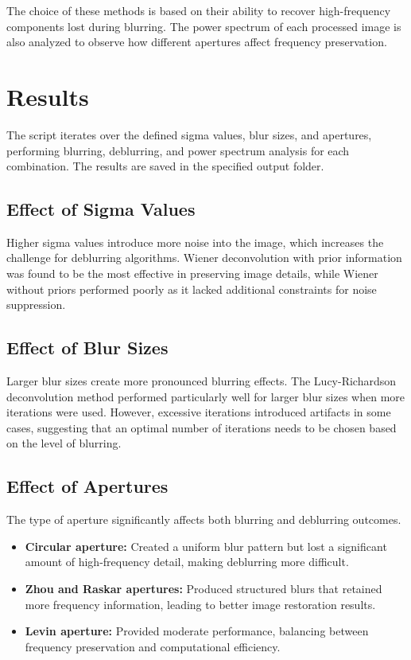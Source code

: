 \documentclass[a4paper,10pt]{article}
\begin{document}
The choice of these methods is based on their ability to recover high-frequency components lost during blurring. The power spectrum of each processed image is also analyzed to observe how different apertures affect frequency preservation.

\section{Results}
The script iterates over the defined sigma values, blur sizes, and apertures, performing blurring, deblurring, and power spectrum analysis for each combination. The results are saved in the specified output folder.

\subsection{Effect of Sigma Values}
Higher sigma values introduce more noise into the image, which increases the challenge for deblurring algorithms. Wiener deconvolution with prior information was found to be the most effective in preserving image details, while Wiener without priors performed poorly as it lacked additional constraints for noise suppression.

\subsection{Effect of Blur Sizes}
Larger blur sizes create more pronounced blurring effects. The Lucy-Richardson deconvolution method performed particularly well for larger blur sizes when more iterations were used. However, excessive iterations introduced artifacts in some cases, suggesting that an optimal number of iterations needs to be chosen based on the level of blurring.

\subsection{Effect of Apertures}
The type of aperture significantly affects both blurring and deblurring outcomes. 
\begin{itemize}
    \item \textbf{Circular aperture:} Created a uniform blur pattern but lost a significant amount of high-frequency detail, making deblurring more difficult.
    \item \textbf{Zhou and Raskar apertures:} Produced structured blurs that retained more frequency information, leading to better image restoration results.
    \item \textbf{Levin aperture:} Provided moderate performance, balancing between frequency preservation and computational efficiency.
\end{itemize}
\end{document}

